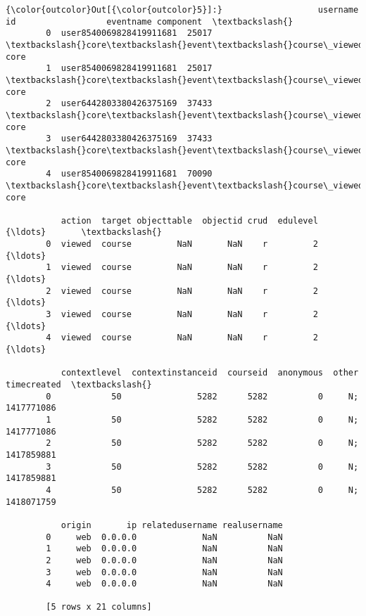 \documentclass[11pt]{article}
\begin{document}
\begin{Verbatim}[commandchars=\\\{\}]
{\color{outcolor}Out[{\color{outcolor}5}]:}                   username     id                  eventname component  \textbackslash{}
        0  user8540069828419911681  25017  \textbackslash{}core\textbackslash{}event\textbackslash{}course\_viewed      core   
        1  user8540069828419911681  25017  \textbackslash{}core\textbackslash{}event\textbackslash{}course\_viewed      core   
        2  user6442803380426375169  37433  \textbackslash{}core\textbackslash{}event\textbackslash{}course\_viewed      core   
        3  user6442803380426375169  37433  \textbackslash{}core\textbackslash{}event\textbackslash{}course\_viewed      core   
        4  user8540069828419911681  70090  \textbackslash{}core\textbackslash{}event\textbackslash{}course\_viewed      core   
        
           action  target objecttable  objectid crud  edulevel     {\ldots}       \textbackslash{}
        0  viewed  course         NaN       NaN    r         2     {\ldots}        
        1  viewed  course         NaN       NaN    r         2     {\ldots}        
        2  viewed  course         NaN       NaN    r         2     {\ldots}        
        3  viewed  course         NaN       NaN    r         2     {\ldots}        
        4  viewed  course         NaN       NaN    r         2     {\ldots}        
        
           contextlevel  contextinstanceid  courseid  anonymous  other timecreated  \textbackslash{}
        0            50               5282      5282          0     N;  1417771086   
        1            50               5282      5282          0     N;  1417771086   
        2            50               5282      5282          0     N;  1417859881   
        3            50               5282      5282          0     N;  1417859881   
        4            50               5282      5282          0     N;  1418071759   
        
           origin       ip relatedusername realusername  
        0     web  0.0.0.0             NaN          NaN  
        1     web  0.0.0.0             NaN          NaN  
        2     web  0.0.0.0             NaN          NaN  
        3     web  0.0.0.0             NaN          NaN  
        4     web  0.0.0.0             NaN          NaN  
        
        [5 rows x 21 columns]
\end{Verbatim}
            
\end{document}
